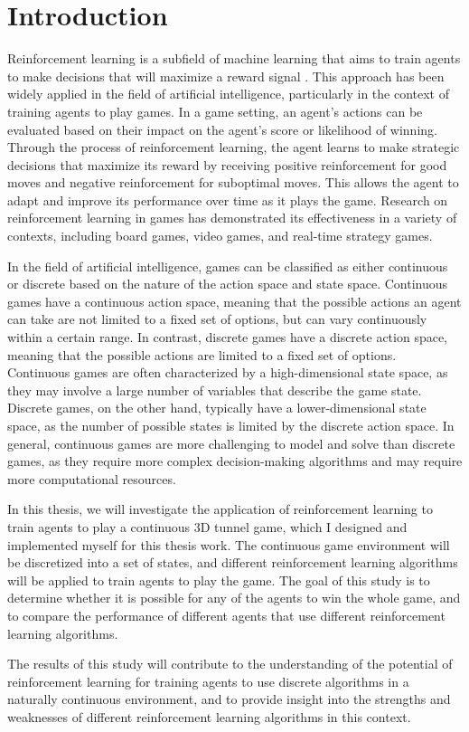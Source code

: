 \chapter*{Introduction}

Reinforcement learning is a subfield of machine learning that aims to train agents to make decisions that will maximize a reward signal \citep{RLSuttonBarto}. This approach has been widely applied in the field of artificial intelligence, particularly in the context of training agents to play games. In a game setting, an agent's actions can be evaluated based on their impact on the agent's score or likelihood of winning. Through the process of reinforcement learning, the agent learns to make strategic decisions that maximize its reward by receiving positive reinforcement for good moves and negative reinforcement for suboptimal moves. This allows the agent to adapt and improve its performance over time as it plays the game. Research on reinforcement learning in games has demonstrated its effectiveness in a variety of contexts, including board games, video games, and real-time strategy games.

In the field of artificial intelligence, games can be classified as either continuous or discrete based on the nature of the action space and state space. Continuous games have a continuous action space, meaning that the possible actions an agent can take are not limited to a fixed set of options, but can vary continuously within a certain range. In contrast, discrete games have a discrete action space, meaning that the possible actions are limited to a fixed set of options.
Continuous games are often characterized by a high-dimensional state space, as they may involve a large number of variables that describe the game state. Discrete games, on the other hand, typically have a lower-dimensional state space, as the number of possible states is limited by the discrete action space.
In general, continuous games are more challenging to model and solve than discrete games, as they require more complex decision-making algorithms and may require more computational resources.

In this thesis, we will investigate the application of reinforcement learning to train agents to play a continuous 3D tunnel game, which I designed and implemented myself for this thesis work. The continuous game environment will be discretized into a set of states, and different reinforcement learning algorithms will be applied to train agents to play the game. The goal of this study is to determine whether it is possible for any of the agents to win the whole game, and to compare the performance of different agents that use different reinforcement learning algorithms.

The results of this study will contribute to the understanding of the potential of reinforcement learning for training agents to use discrete algorithms in a naturally continuous environment, and to provide insight into the strengths and weaknesses of different reinforcement learning algorithms in this context.\